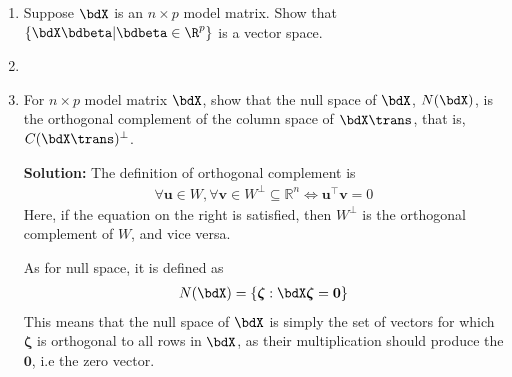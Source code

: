 \begin{enumerate}
\item Suppose $\bdX$ is an $n\times p$ model matrix.
Show that
$\{\bdX\bdbeta | \bdbeta \in \R^p \}$ 
is a vector space.



\item 
\be
\item For $n\times p$ model matrix $\bdX$, show that the null space of
$\bdX$, $N(\bdX)$, is the orthogonal complement of the column space of
$\bdX\trans$, that is, $C(\bdX\trans)^\perp$. 
\begin{hwanswer}
	\textbf{Solution:} The definition of orthogonal complement is 
\begin{align*}
	\forall \bm u \in W, \forall \bm v \in W^\bot \subseteq \mathbb{R}^n \iff \bm u^\top \bm v = 0
\end{align*}
Here, if the equation on the right is satisfied, then $W^\bot$ is the orthogonal complement of $W$, and vice versa.

As for null space, it is defined as
\begin{align*}
	N(\bdX)=\{\bm \zeta : \bdX \bm \zeta = \bm 0\}
\end{align*}
This means that the null space of $\bdX$ is simply the set of vectors for which $\bm \zeta$ is orthogonal to all rows in $\bdX$, as their multiplication should produce the $\bm 0$, i.e the zero vector. 


\end{hwanswer}
\end{enumerate}
